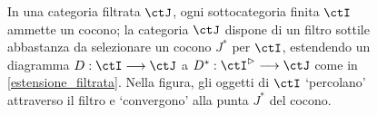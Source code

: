 \begin{figure}
\begin{center}
	\end{center}
	\caption{In una categoria filtrata \(\ctJ\), ogni sottocategoria finita \(\ctI\) ammette un cocono; la categoria \(\ctJ\) dispone di un filtro sottile abbastanza da selezionare un cocono \(J^*\) per \(\ctI\), estendendo un diagramma \(D : \ctI \fun\ctJ\) a \(D^* : \ctI^\rhd \fun \ctJ\) come in \ref{estensione_filtrata}. Nella figura, gli oggetti di \(\ctI\) `percolano' attraverso il filtro e `convergono' alla punta \(J^*\) del cocono.}
	\label{fig_filtro_setaccio}
\end{figure}
